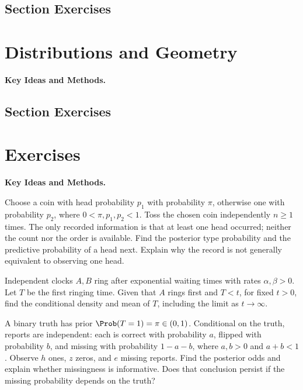 \subsection*{Section Exercises}



\section{Distributions and Geometry}
\noindent\textbf{Key Ideas and Methods.}\enspace














\par{}
\subsection*{Section Exercises}




\section{Exercises}
\noindent\textbf{Key Ideas and Methods.}\enspace



\begingroup
\setlength{\parskip}{0pt}

Choose a coin with head probability $p_1$ with probability $\pi$, otherwise one with probability $p_2$, where $0<\pi,p_1,p_2<1$. Toss the chosen coin independently $n\ge1$ times. The only recorded information is that at least one head occurred; neither the count nor the order is available. Find the posterior type probability and the predictive probability of a head next. Explain why the record is not generally equivalent to observing one head.

Independent clocks $A,B$ ring after exponential waiting times with rates $\alpha,\beta>0$. Let $T$ be the first ringing time. Given that $A$ rings first and $T<t$, for fixed $t>0$, find the conditional density and mean of $T$, including the limit as $t\to\infty$.

A binary truth has prior $\Prob(T=1)=\pi\in(0,1)$. Conditional on the truth, reports are independent: each is correct with probability $a$, flipped with probability $b$, and missing with probability $1-a-b$, where $a,b>0$ and $a+b<1$. Observe $h$ ones, $z$ zeros, and $e$ missing reports. Find the posterior odds and explain whether missingness is informative. Does that conclusion persist if the missing probability depends on the truth?

